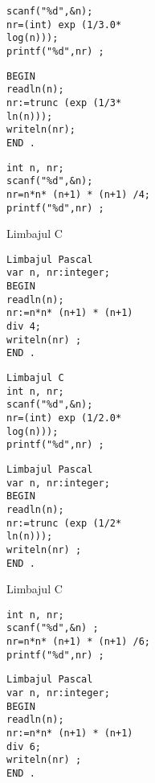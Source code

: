 \begin{verbatim}
scanf("%d",&n);
nr=(int) exp (1/3.0*
log(n)));
printf("%d",nr) ;
\end{verbatim}

\begin{verbatim}
BEGIN
readln(n);
nr:=trunc (exp (1/3*
ln(n)));
writeln(nr);
END .
\end{verbatim}

\begin{verbatim}
int n, nr;
scanf("%d",&n);
nr=n*n* (n+1) * (n+1) /4;
printf("%d",nr) ;
\end{verbatim}

Limbajul C

\begin{verbatim}
Limbajul Pascal
var n, nr:integer;
BEGIN
readln(n);
nr:=n*n* (n+1) * (n+1)
div 4;
writeln(nr) ;
END .
\end{verbatim}

\begin{verbatim}
Limbajul C
int n, nr;
scanf("%d",&n);
nr=(int) exp (1/2.0*
log(n)));
printf("%d",nr) ;
\end{verbatim}

\begin{verbatim}
Limbajul Pascal
var n, nr:integer;
BEGIN
readln(n);
nr:=trunc (exp (1/2*
ln(n)));
writeln(nr) ;
END .
\end{verbatim}

Limbajul C

\begin{verbatim}
int n, nr;
scanf("%d",&n) ;
nr=n*n* (n+1) * (n+1) /6;
printf("%d",nr) ;
\end{verbatim}

\begin{verbatim}
Limbajul Pascal
var n, nr:integer;
BEGIN
readln(n);
nr:=n*n* (n+1) * (n+1)
div 6;
writeln(nr) ;
END .
\end{verbatim}

